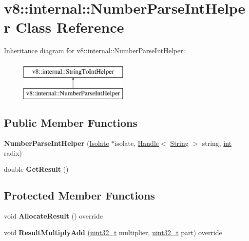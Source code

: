\hypertarget{classv8_1_1internal_1_1NumberParseIntHelper}{}\section{v8\+:\+:internal\+:\+:Number\+Parse\+Int\+Helper Class Reference}
\label{classv8_1_1internal_1_1NumberParseIntHelper}
Inheritance diagram for v8\+:\+:internal\+:\+:Number\+Parse\+Int\+Helper\+:\begin{figure}[H]
\begin{center}
\leavevmode
\includegraphics[height=2.000000cm]{classv8_1_1internal_1_1NumberParseIntHelper}
\end{center}
\end{figure}
\subsection*{Public Member Functions}
\begin{DoxyCompactItemize}
\item 
\mbox{\label{classv8_1_1internal_1_1NumberParseIntHelper_ab95610c2df261d830730817a3cddb495}} 
{\bfseries Number\+Parse\+Int\+Helper} (\mbox{\hyperlink{classv8_1_1internal_1_1Isolate}{Isolate}} $\ast$isolate, \mbox{\hyperlink{classv8_1_1internal_1_1Handle}{Handle}}$<$ \mbox{\hyperlink{classv8_1_1internal_1_1String}{String}} $>$ string, \mbox{\hyperlink{classint}{int}} radix)
\item 
\mbox{\label{classv8_1_1internal_1_1NumberParseIntHelper_a8ca37c507a54804b4c2ded0d4f23a29d}} 
double {\bfseries Get\+Result} ()
\end{DoxyCompactItemize}
\subsection*{Protected Member Functions}
\begin{DoxyCompactItemize}
\item 
\mbox{\label{classv8_1_1internal_1_1NumberParseIntHelper_a555f567330416372c50740b91aace18e}} 
void {\bfseries Allocate\+Result} () override
\item 
\mbox{\label{classv8_1_1internal_1_1NumberParseIntHelper_a25635298df76ba3b33f876d774627d45}} 
void {\bfseries Result\+Multiply\+Add} (\mbox{\hyperlink{classuint32__t}{uint32\+\_\+t}} multiplier, \mbox{\hyperlink{classuint32__t}{uint32\+\_\+t}} part) override
\end{DoxyCompactItemize}
